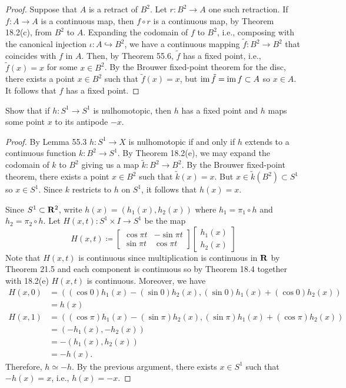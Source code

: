 \begin{proof}
Suppose that $A$ is a retract of $B^2$. Let $r\colon B^2\to A$ one such
retraction. If $f\colon A\to A$ is a continuous map, then $f\circ r$ is a
continuous map, by Theorem 18.2(c), from $B^2$ to $A$. Expanding the
codomain of $f$ to $B^2$, i.e., composing with the canonical injection
$\iota\colon A\hookrightarrow B^2$, we have a continuous mapping
$\tilde{f}\colon B^2\to B^2$ that coincides with $f$ in $A$. Then, by
Theorem 55.6, $\tilde f$ has a fixed point, i.e., $\tilde{f}(x)=x$ for some
$x\in B^2$. By the Brouwer fixed-point theorem for the disc, there exists a
point $x\in B^2$ such that $\tilde{f}(x)=x$, but $\operatorname{im}{\tilde{f}}=\operatorname{im}
f\subset A$ so $x\in A$. It follows that $f$ has a fixed point.
\end{proof}
\newpage
\begin{problem}[Munkres \S55, Ex.\,2]
Show that if $h\colon S^1\to S^1$ is nulhomotopic, then $h$ has a
fixed point and $h$ maps some point $x$ to its antipode $-x$.
\end{problem}
\begin{proof}
By Lemma 55.3 $h\colon S^1\to X$ is nulhomotopic if and only if $h$ extends
to a continuous function $k\colon B^2\to S^1$. By Theorem 18.2(e), we may
expand the codomain of $k$ to $B^2$ giving us a map $\tilde k\colon B^2\to
B^2$. By the Brouwer fixed-point theorem, there exists a point $x\in B^2$
such that $\tilde k(x)=x$. But $x\in \tilde k(B^2)\subset S^1$ so $x\in
S^1$. Since $k$ restricts to $h$ on $S^1$, it follows that $h(x)=x$.

Since $S^1\subset\mathbf{R}^2$, write $h(x)=(h_1(x),h_2(x))$ where $h_1=\pi_1\circ
h$ and $h_2=\pi_2\circ h$. Let $H(x,t)\colon S^1\times I\to S^1$ be the map
\[
H(x,t)\coloneqq
\begin{bmatrix}
\cos\pi t&-\sin\pi t\\
\sin\pi t&\cos\pi t
\end{bmatrix}
\begin{bmatrix}
h_1(x)\\
h_2(x)
\end{bmatrix}
\]
Note that $H(x,t)$ is continuous since multiplication is continuous in
$\mathbf{R}$ by Theorem 21.5 and each component is continuous so by Theorem 18.4
together with 18.2(e) $H(x,t)$ is continuous. Moreover, we have
\begin{align*}
H(x,0)&=((\cos 0)h_1(x)-(\sin 0)h_2(x),(\sin 0)h_1(x)+(\cos 0)h_2(x))\\
      &=h(x)\\
H(x,1)&=((\cos \pi)h_1(x)-(\sin \pi)h_2(x),(\sin \pi)h_1(x)+(\cos
        \pi)h_2(x))\\
      &=(-h_1(x),-h_2(x))\\
      &=-(h_1(x),h_2(x))\\
      &=-h(x).
\end{align*}
Therefore, $h\simeq -h$. By the previous argument, there exists $x\in S^1$
such that $-h(x)=x$, i.e., $h(x)=-x$.
\end{proof}

